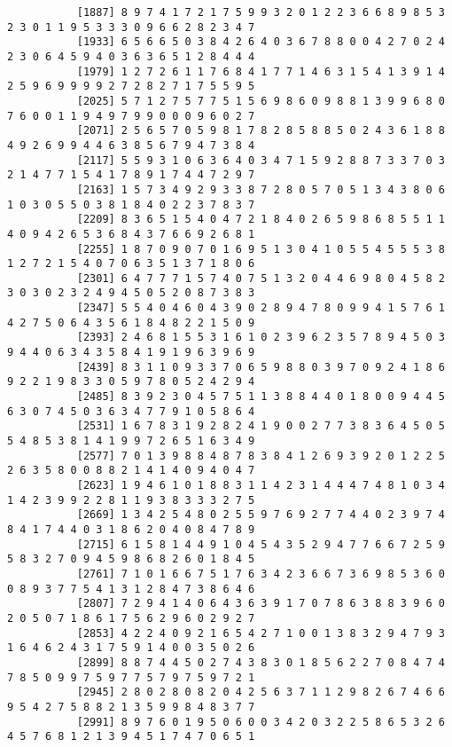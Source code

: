 \documentclass{article}
\begin{document}
\begin{itemize}
\begin{scriptsize}
\begin{verbatim}
		   [1887] 8 9 7 4 1 7 2 1 7 5 9 9 3 2 0 1 2 2 3 6 6 8 9 8 5 3 2 3 0 1 1 9 5 3 3 3 0 9 6 6 2 8 2 3 4 7
		   [1933] 6 5 6 6 5 0 3 8 4 2 6 4 0 3 6 7 8 8 0 0 4 2 7 0 2 4 2 3 0 6 4 5 9 4 0 3 6 3 6 5 1 2 8 4 4 4
		   [1979] 1 2 7 2 6 1 1 7 6 8 4 1 7 7 1 4 6 3 1 5 4 1 3 9 1 4 2 5 9 6 9 9 9 9 2 7 2 8 2 7 1 7 5 5 9 5
		   [2025] 5 7 1 2 7 5 7 7 5 1 5 6 9 8 6 0 9 8 8 1 3 9 9 6 8 0 7 6 0 0 1 1 9 4 9 7 9 9 0 0 0 9 6 0 2 7
		   [2071] 2 5 6 5 7 0 5 9 8 1 7 8 2 8 5 8 8 5 0 2 4 3 6 1 8 8 4 9 2 6 9 9 4 4 6 3 8 5 6 7 9 4 7 3 8 4
		   [2117] 5 5 9 3 1 0 6 3 6 4 0 3 4 7 1 5 9 2 8 8 7 3 3 7 0 3 2 1 4 7 7 1 5 4 1 7 8 9 1 7 4 4 7 2 9 7
		   [2163] 1 5 7 3 4 9 2 9 3 3 8 7 2 8 0 5 7 0 5 1 3 4 3 8 0 6 1 0 3 0 5 5 0 3 8 1 8 4 0 2 2 3 7 8 3 7
		   [2209] 8 3 6 5 1 5 4 0 4 7 2 1 8 4 0 2 6 5 9 8 6 8 5 5 1 1 4 0 9 4 2 6 5 3 6 8 4 3 7 6 6 9 2 6 8 1
		   [2255] 1 8 7 0 9 0 7 0 1 6 9 5 1 3 0 4 1 0 5 5 4 5 5 5 3 8 1 2 7 2 1 5 4 0 7 0 6 3 5 1 3 7 1 8 0 6
		   [2301] 6 4 7 7 7 1 5 7 4 0 7 5 1 3 2 0 4 4 6 9 8 0 4 5 8 2 3 0 3 0 2 3 2 4 9 4 5 0 5 2 0 8 7 3 8 3
		   [2347] 5 5 4 0 4 6 0 4 3 9 0 2 8 9 4 7 8 0 9 9 4 1 5 7 6 1 4 2 7 5 0 6 4 3 5 6 1 8 4 8 2 2 1 5 0 9
		   [2393] 2 4 6 8 1 5 5 3 1 6 1 0 2 3 9 6 2 3 5 7 8 9 4 5 0 3 9 4 4 0 6 3 4 3 5 8 4 1 9 1 9 6 3 9 6 9
		   [2439] 8 3 1 1 0 9 3 3 7 0 6 5 9 8 8 0 3 9 7 0 9 2 4 1 8 6 9 2 2 1 9 8 3 3 0 5 9 7 8 0 5 2 4 2 9 4
		   [2485] 8 3 9 2 3 0 4 5 7 5 1 1 3 8 8 4 4 0 1 8 0 0 9 4 4 5 6 3 0 7 4 5 0 3 6 3 4 7 7 9 1 0 5 8 6 4
		   [2531] 1 6 7 8 3 1 9 2 8 2 4 1 9 0 0 2 7 7 3 8 3 6 4 5 0 5 5 4 8 5 3 8 1 4 1 9 9 7 2 6 5 1 6 3 4 9
		   [2577] 7 0 1 3 9 8 8 4 8 7 8 3 8 4 1 2 6 9 3 9 2 0 1 2 2 5 2 6 3 5 8 0 0 8 8 2 1 4 1 4 0 9 4 0 4 7
		   [2623] 1 9 4 6 1 0 1 8 8 3 1 1 4 2 3 1 4 4 4 7 4 8 1 0 3 4 1 4 2 3 9 9 2 2 8 1 1 9 3 8 3 3 3 2 7 5
		   [2669] 1 3 4 2 5 4 8 0 2 5 5 9 7 6 9 2 7 7 4 4 0 2 3 9 7 4 8 4 1 7 4 4 0 3 1 8 6 2 0 4 0 8 4 7 8 9
		   [2715] 6 1 5 8 1 4 4 9 1 0 4 5 4 3 5 2 9 4 7 7 6 6 7 2 5 9 5 8 3 2 7 0 9 4 5 9 8 6 8 2 6 0 1 8 4 5
		   [2761] 7 1 0 1 6 6 7 5 1 7 6 3 4 2 3 6 6 7 3 6 9 8 5 3 6 0 0 8 9 3 7 7 5 4 1 3 1 2 8 4 7 3 8 6 4 6
		   [2807] 7 2 9 4 1 4 0 6 4 3 6 3 9 1 7 0 7 8 6 3 8 8 3 9 6 0 2 0 5 0 7 1 8 6 1 7 5 6 2 9 6 0 2 9 2 7
		   [2853] 4 2 2 4 0 9 2 1 6 5 4 2 7 1 0 0 1 3 8 3 2 9 4 7 9 3 1 6 4 6 2 4 3 1 7 5 9 1 4 0 0 3 5 0 2 6
		   [2899] 8 8 7 4 4 5 0 2 7 4 3 8 3 0 1 8 5 6 2 2 7 0 8 4 7 4 7 8 5 0 9 9 7 5 9 7 7 5 7 9 7 5 9 7 2 1
		   [2945] 2 8 0 2 8 0 8 2 0 4 2 5 6 3 7 1 1 2 9 8 2 6 7 4 6 6 9 5 4 2 7 5 8 8 2 1 3 5 9 9 8 4 8 3 7 7
		   [2991] 8 9 7 6 0 1 9 5 0 6 0 0 3 4 2 0 3 2 2 5 8 6 5 3 2 6 4 5 7 6 8 1 2 1 3 9 4 5 1 7 4 7 0 6 5 1

\end{verbatim}
\end{scriptsize}
\end{itemize}
\end{document}
